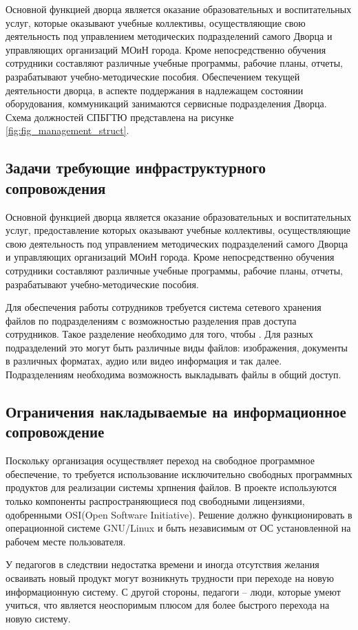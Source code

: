 \documentclass[utf8,usehyperref,12pt]{G7-32}
\begin{document}
Основной функцией дворца является оказание образовательных и воспитательных услуг, которые оказывают учебные коллективы, осуществляющие свою деятельность под управлением методических подразделений самого Дворца
и управляющих организаций МОиН города. Кроме непосредственно обучения сотрудники  составляют различные учебные программы, рабочие планы, отчеты, разрабатывают учебно-методические пособия.
Обеспечением текущей деятельности дворца, в аспекте поддержания в надлежащем состоянии оборудования, коммуникаций занимаются сервисные подразделения Дворца. Схема должностей СПБГТЮ представлена на рисунке \ref{fig:fig_management_struct}.

\subsection{Задачи требующие инфраструктурного сопровождения}\label{ssect:tasks_infra}
Основной функцией дворца является оказание образовательных и воспитательных услуг, предоставление которых оказывают учебные коллективы, осуществляющие свою деятельность под управлением методических подразделений самого Дворца
и управляющих организаций МОиН города. Кроме непосредственно обучения сотрудники составляют различные учебные программы, рабочие планы, отчеты, разрабатывают учебно-методические пособия. 

Для обеспечения работы сотрудников требуется система сетевого хранения файлов по подразделениям с возможностью разделения прав доступа сотрудников. Такое разделение необходимо для того, чтобы . Для разных подразделений это могут быть различные виды файлов: изображения, документы в различных форматах, аудио или видео информация и так далее. Подразделениям необходима возможность выкладывать файлы в общий доступ.

\subsection{Ограничения накладываемые на информационное сопровождение}\label{ssect:restrict_infra}
Поскольку организация осуществляет переход на свободное программное обеспечение, то требуется использование исключительно свободных программных продуктов для реализации системы хрпнения файлов. В проекте используются только компоненты распространяющиеся под свободными лицензиями, одобренными OSI(Open Software Initiative). Решение должно функционировать в операционной системе GNU/Linux и быть независимым от ОС установленной на рабочем месте пользователя.

У педагогов в следствии недостатка времени и иногда отсутствия желания осваивать новый продукт могут возникнуть трудности при переходе на новую информационную систему. С другой стороны, педагоги – люди, которые умеют учиться, что является неоспоримым плюсом для более быстрого перехода на новую систему.
\end{document}
